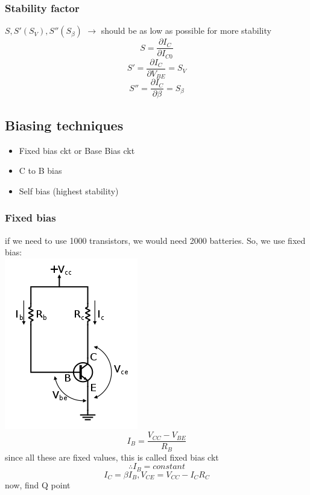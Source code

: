 \documentclass[10pt, a4paper]{report}
\begin{document}
	\subsubsection{Stability factor}
	$ S, S'(S_V), S''(S_\beta) $ $\rightarrow$ should be as low as possible for more stability
	$$ S = \dfrac{\partial I_C}{\partial I_{C0}} $$
	$$ S' = \dfrac{\partial I_C}{\partial V_{BE}} = S_V $$
	$$ S'' = \dfrac{\partial I_C}{\partial \beta} = S_\beta $$
	\subsection{Biasing techniques}
	\begin{itemize}
		\item Fixed bias ckt or Base Bias ckt
		\item C to B bias
		\item Self bias (highest stability)
	\end{itemize}

	\subsubsection{Fixed bias}
	if we need to use 1000 transistors, we would need 2000 batteries. So, we use fixed bias:\\
	\includegraphics[width=0.5\linewidth]{img/fixed bias}\\
	$$ I_B = \dfrac{V_{CC}-V_{BE}}{R_B} $$
	since all these are fixed values, this is called fixed bias ckt
	$$ \therefore I_B = constant $$
	$$ I_C = \beta I_B, V_{CE} = V_{CC} - I_CR_C $$
	now, find Q point
\end{document}
